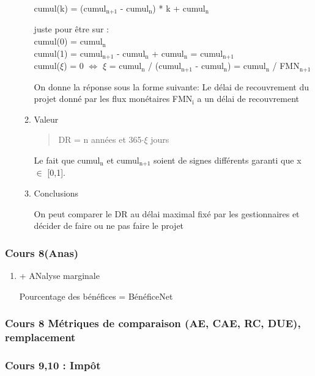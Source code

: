 \documentclass[11pt]{article}
\begin{document}
\begin{enumerate}
\begin{enumerate}
cumul(k) = (cumul\(_{\text{n+1}}\) - cumul\(_{\text{n}}\)) * k + cumul\(_{\text{n}}\)

juste pour être sur :\\
cumul(0) = cumul\(_{\text{n}}\) \\
cumul(1) = cumul\(_{\text{n+1}}\) - cumul\(_{\text{n}}\) + cumul\(_{\text{n}}\) = cumul\(_{\text{n+1}}\) \\

cumul(\(\xi\)) = 0 \(\Leftrightarrow\) \(\xi\) = cumul\(_{\text{n}}\) / (cumul\(_{\text{n+1}}\) - cumul\(_{\text{n}}\)) = cumul\(_{\text{n}}\) / FMN\(_{\text{n+1}}\)

On donne la réponse sous la forme suivante: Le délai de recouvrement du projet
donné par les flux monétaires FMN\(_{\text{i}}\) a un délai de recouvrement 

\item Valeur
\label{sec:orgebd181a}

\begin{quote}
DR = n années et 365\(\cdot \xi\) jours
\end{quote}

Le fait que cumul\(_{\text{n}}\) et cumul\(_{\text{n+1}}\) soient de signes différents garanti que x \(\in\) [0,1].

\item Conclusions
\label{sec:org7df16a3}

On peut comparer le DR au délai maximal fixé par les gestionnaires et décider de
faire ou ne pas faire le projet
\end{enumerate}
\end{enumerate}
\subsubsection{Cours 8(Anas)}
\label{sec:org5d70f34}
\begin{enumerate}
\item + ANalyse marginale
\label{sec:org3dfcf47}

Pourcentage des bénéfices = BénéficeNet
\end{enumerate}
\subsubsection{Cours 8 Métriques de comparaison (AE, CAE, RC, DUE), remplacement}
\label{sec:org0a2d205}
\subsubsection{Cours 9,10 : Impôt}
\label{sec:org79166b7}
\end{document}
